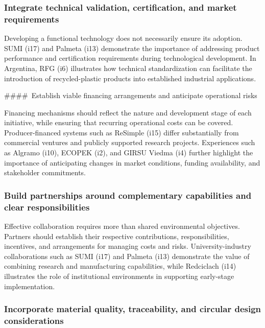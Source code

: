 \documentclass[
  12pt,
  oneside]{book}
\begin{document}
\subsubsection{Integrate technical validation, certification, and market
requirements}\label{integrate-technical-validation-certification-and-market-requirements}

Developing a functional technology does not necessarily ensure its
adoption. SUMI (i17) and Palmeta (i13) demonstrate the importance of
addressing product performance and certification requirements during
technological development. In Argentina, RFG (i6) illustrates how
technical standardization can facilitate the introduction of
recycled-plastic products into established industrial applications.

\#\#\#\#~Establish viable financing arrangements and anticipate
operational risks

Financing mechanisms should reflect the nature and development stage of
each initiative, while ensuring that recurring operational costs can be
covered. Producer-financed systems such as ReSimple (i15) differ
substantially from commercial ventures and publicly supported research
projects. Experiences such as Algramo (i10), ECOPEK (i2), and GIRSU
Viedma (i4) further highlight the importance of anticipating changes in
market conditions, funding availability, and stakeholder commitments.

\subsubsection{Build partnerships around complementary capabilities and
clear
responsibilities}\label{build-partnerships-around-complementary-capabilities-and-clear-responsibilities}

Effective collaboration requires more than shared environmental
objectives. Partners should establish their respective contributions,
responsibilities, incentives, and arrangements for managing costs and
risks. University-industry collaborations such as SUMI (i17) and Palmeta
(i13) demonstrate the value of combining research and manufacturing
capabilities, while Redciclach (i14) illustrates the role of
institutional environments in supporting early-stage implementation.

\subsubsection{Incorporate material quality, traceability, and circular
design
considerations}\label{incorporate-material-quality-traceability-and-circular-design-considerations}
\end{document}
